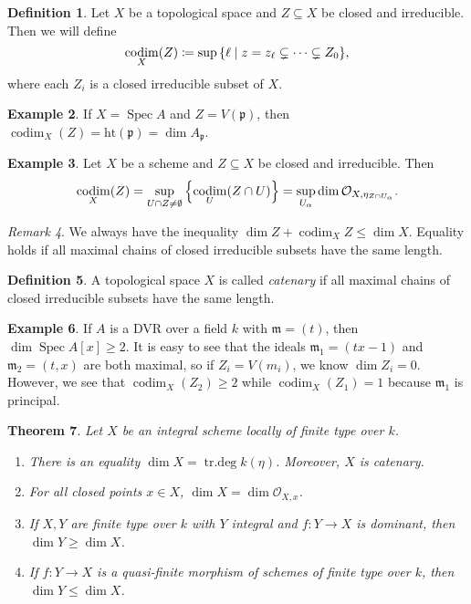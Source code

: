 \documentclass[leqno, openany]{memoir}
\newtheorem{thm}{Theorem}[section]
\theoremstyle{definition}
\newtheorem{defn}[thm]{Definition}
\newtheorem{exm}[thm]{Example}
\theoremstyle{remark}
\newtheorem{rmk}[thm]{Remark}
\theoremstyle{plain}
\theoremstyle{definition}
\theoremstyle{remark}
\newcommand{\mc}[1]{\mathcal{#1}}
\newcommand{\mf}[1]{\mathfrak{#1}}
\newcommand{\mr}[1]{\mathrm{#1}}
\DeclareMathOperator{\Spec}{Spec}
\DeclareMathOperator{\codim}{codim}
\begin{document}
\begin{defn} Let $X$ be a topological space and $Z \subseteq X$ be closed and
    irreducible. Then we will define \[ \codim_X(Z) \coloneqq \sup \qty{\ell
    \mid z = z_{\ell} \subsetneq \cdots \subsetneq Z_0}, \] where each $Z_i$ is
    a closed irreducible subset of $X$.  \end{defn}

\begin{exm} If $X = \Spec A$ and $Z = V(\mf{p})$, then $\codim_X(Z) =
\mr{ht}(\mf{p}) = \dim A_{\mf{p}}$.  \end{exm}

\begin{exm} Let $X$ be a scheme and $Z \subseteq X$ be closed and irreducible.
    Then \[ \codim_X(Z) = \sup_{U \cap Z \neq \emptyset} \qty{\codim_U (Z \cap
    U)} = \sup_{U_{\alpha}} \dim \mc{O}_{X, \eta_{Z \cap U_{\alpha}}}. \]
\end{exm}

\begin{rmk} We always have the inequality $\dim Z + \codim_X Z \leq \dim X$.
Equality holds if all maximal chains of closed irreducible subsets have the
same length.  \end{rmk}

\begin{defn} A topological space $X$ is called \textit{catenary} if all maximal
chains of closed irreducible subsets have the same length.  \end{defn}

\begin{exm} If $A$ is a DVR over a field $k$ with $\mf{m} = (t)$, then $\dim
    \Spec A[x] \geq 2$. It is easy to see that the ideals $\mf{m}_1 = (tx-1)$
    and $\mf{m}_2 = (t,x)$ are both maximal, so if $Z_i = V(m_i)$, we know
    $\dim Z_i = 0$. However, we see that $\codim_X(Z_2) \geq 2$ while $\codim_X
    (Z_1) = 1$ because $\mf{m}_1$ is principal.  \end{exm}

\begin{thm}\label{thm:dimfinitetype} Let $X$ be an integral scheme locally of
    finite type over $k$.  \begin{enumerate} \item There is an equality $\dim X
        = \operatorname{tr.deg} k(\eta)$. Moreover, $X$ is catenary.  \item For
        all closed points $x \in X$, $\dim X = \dim \mc{O}_{X,x}$.  \item If
        $X, Y$ are finite type over $k$ with $Y$ integral and $f \colon Y \to
        X$ is dominant, then $\dim Y \geq \dim X$.  \item If $f \colon Y \to X$
        is a quasi-finite morphism of schemes of finite type over $k$, then
        $\dim Y \leq \dim X$.  \end{enumerate} \end{thm}
\end{document}
